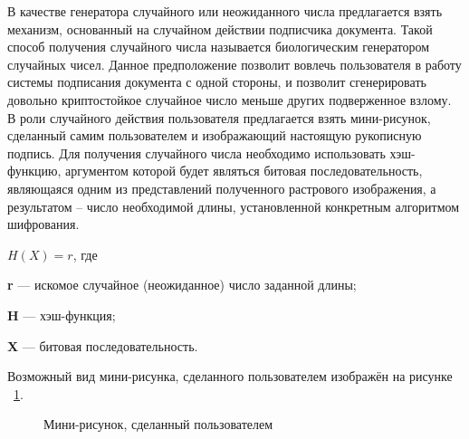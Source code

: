 В качестве генератора случайного или неожиданного числа предлагается взять
механизм, основанный на случайном действии подписчика документа. Такой способ
получения случайного числа называется биологическим генератором случайных чисел.
Данное предположение позволит вовлечь пользователя в работу системы подписания
документа с одной стороны, и позволит сгенерировать довольно криптостойкое
случайное число меньше других подверженное взлому. В роли случайного действия
пользователя предлагается взять мини-рисунок, сделанный самим пользователем и
изображающий настоящую рукописную подпись. Для получения случайного числа
необходимо использовать хэш-функцию, аргументом которой будет являться битовая
последовательность, являющаяся одним из представлений полученного растрового
изображения, а результатом -- число необходимой длины, установленной конкретным
алгоритмом шифрования.~\cite{conf_isit_lsa_protocols}

\begin{center}
$H(X) = r$, где
\end{center} 

\textbf{r} --- искомое случайное (неожиданное) число заданной
длины; 

\textbf{H} --- хэш-функция; 

\textbf{X} --- битовая последовательность.

Возможный вид мини-рисунка, сделанного пользователем изображён на рисунке
~\ref{ris:4.1}.

\begin{figure}[h!]
\center{\texttt{[image: 4-1]}}
\caption{Мини-рисунок, сделанный пользователем}
\label{ris:4.1}
\end{figure} 

